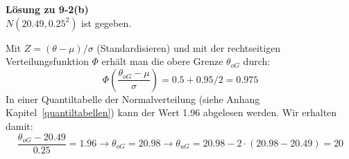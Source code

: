 \textbf{Lösung zu 9-2(b)} \\
$N(20.49,0.25^2)$ ist gegeben. 

Mit $Z=(\theta - \mu)/ \sigma$ (Standardisieren) und mit der rechtseitigen Verteilungsfunktion $\Phi$  
erhält man die obere Grenze $\theta_{oG}$ durch:
\[
\Phi\left(\frac{\theta_{oG}-\mu}{\sigma}\right) = 0.5 + 0.95/2 = 0.975   
\]
In einer Quantiltabelle der Normalverteilung (siehe Anhang Kapitel~\ref{quantiltabellen})
kann der Wert 1.96 abgelesen werden. Wir erhalten damit: 
\[
\frac{\theta_{oG}-20.49}{0.25} = 1.96 \rightarrow \theta_{oG} = 20.98 
\rightarrow \theta_{uG} = 20.98 - 2 \cdot (20.98-20.49) = 20
\]

